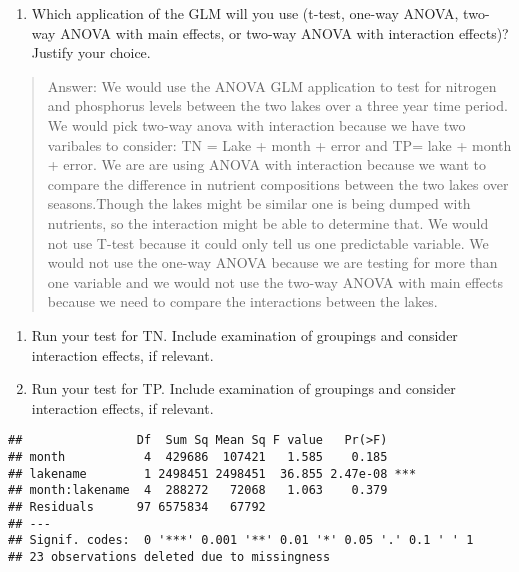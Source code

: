 \documentclass[]{article}
\newenvironment{Shaded}{\begin{snugshade}}{\end{snugshade}}
\newcommand{\CommentTok}[1]{\textcolor[rgb]{0.56,0.35,0.01}{\textit{#1}}}
\newcommand{\DataTypeTok}[1]{\textcolor[rgb]{0.13,0.29,0.53}{#1}}
\newcommand{\FloatTok}[1]{\textcolor[rgb]{0.00,0.00,0.81}{#1}}
\newcommand{\KeywordTok}[1]{\textcolor[rgb]{0.13,0.29,0.53}{\textbf{#1}}}
\newcommand{\NormalTok}[1]{#1}
\newcommand{\OperatorTok}[1]{\textcolor[rgb]{0.81,0.36,0.00}{\textbf{#1}}}
\newcommand{\StringTok}[1]{\textcolor[rgb]{0.31,0.60,0.02}{#1}}
\providecommand{\tightlist}{%
  \setlength{\itemsep}{0pt}\setlength{\parskip}{0pt}}
\begin{document}
\begin{enumerate}
\def\labelenumi{\arabic{enumi}.}
\setcounter{enumi}{3}
\tightlist
\item
  Which application of the GLM will you use (t-test, one-way ANOVA,
  two-way ANOVA with main effects, or two-way ANOVA with interaction
  effects)? Justify your choice.
\end{enumerate}

\begin{quote}
Answer: We would use the ANOVA GLM application to test for nitrogen and
phosphorus levels between the two lakes over a three year time period.
We would pick two-way anova with interaction because we have two
varibales to consider: TN = Lake + month + error and TP= lake + month +
error. We are are using ANOVA with interaction because we want to
compare the difference in nutrient compositions between the two lakes
over seasons.Though the lakes might be similar one is being dumped with
nutrients, so the interaction might be able to determine that. We would
not use T-test because it could only tell us one predictable variable.
We would not use the one-way ANOVA because we are testing for more than
one variable and we would not use the two-way ANOVA with main effects
because we need to compare the interactions between the lakes.
\end{quote}

\begin{enumerate}
\def\labelenumi{\arabic{enumi}.}
\setcounter{enumi}{4}
\item
  Run your test for TN. Include examination of groupings and consider
  interaction effects, if relevant.
\item
  Run your test for TP. Include examination of groupings and consider
  interaction effects, if relevant.
\end{enumerate}

\begin{Shaded}
\end{Shaded}

\begin{verbatim}
##                Df  Sum Sq Mean Sq F value   Pr(>F)    
## month           4  429686  107421   1.585    0.185    
## lakename        1 2498451 2498451  36.855 2.47e-08 ***
## month:lakename  4  288272   72068   1.063    0.379    
## Residuals      97 6575834   67792                     
## ---
## Signif. codes:  0 '***' 0.001 '**' 0.01 '*' 0.05 '.' 0.1 ' ' 1
## 23 observations deleted due to missingness
\end{verbatim}
\end{document}
